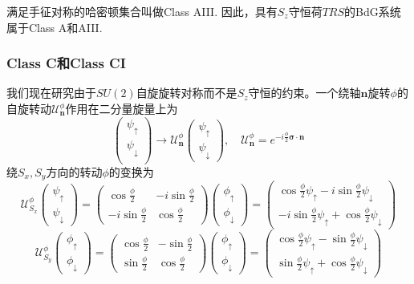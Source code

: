 \documentclass{article}
\numberwithin{equation}{subsection}
\newcommand{\mU}{\mathcal{U}}
\begin{document}
满足手征对称的哈密顿集合叫做Class AIII. 因此，具有$S_z$守恒荷$TRS$的BdG系统属于Class A和AIII.
\subsubsection{Class C和Class CI}
我们现在研究由于$SU(2)$自旋旋转对称而不是$S_z$守恒的约束。一个绕轴$\mathbf{n}$旋转$\phi$的自旋转动$\mU_{\mathbf{n}}^\phi$作用在二分量旋量上为
\begin{equation}
    \begin{pmatrix}
        \psi_\uparrow\\
        \psi_\downarrow\\
    \end{pmatrix}\rightarrow\mU_{\mathbf{n}}^\phi\begin{pmatrix}
        \psi_\uparrow\\
        \psi_\downarrow
    \end{pmatrix},\quad \mU_{\mathbf{n}}^{\phi}=e^{-i\frac{\phi}{2}\mathbf{\sigma}\cdot\mathbf{n}}
\end{equation}
绕$S_x,S_y$方向的转动$\phi$的变换为
\begin{equation}
    \mU_{S_x}^\phi\begin{pmatrix}
        \psi_{\uparrow}\\
        \psi_{\downarrow}
    \end{pmatrix}=\begin{pmatrix}
        \cos\frac{\phi}{2}&-i\sin\frac{\phi}{2}\\
        -i\sin\frac{\phi}{2}&\cos\frac{\phi}{2}
    \end{pmatrix}\begin{pmatrix}
        \phi_\uparrow\\
        \phi_\downarrow
    \end{pmatrix}=\begin{pmatrix}
        \cos\frac{\phi}{2}\psi_\uparrow-i\sin\frac{\phi}{2}\psi_\downarrow\\
        -i\sin\frac{\phi}{2}\psi_\uparrow+\cos\frac{\phi}{2}\psi_\downarrow
    \end{pmatrix}
\end{equation}
\begin{equation}
    \mU_{S_y}^\phi\begin{pmatrix}
        \phi_\uparrow\\
        \phi_\downarrow
    \end{pmatrix}=\begin{pmatrix}
        \cos\frac{\phi}{2}&-\sin\frac{\phi}{2}\\
        \sin\frac{\phi}{2}&\cos\frac{\phi}{2}
    \end{pmatrix}\begin{pmatrix}
        \phi_\uparrow\\
        \phi_\downarrow
    \end{pmatrix}=\begin{pmatrix}
        \cos\frac{\phi}{2}\psi_\uparrow-\sin\frac{\phi}{2}\psi_\downarrow\\
        \sin\frac{\phi}{2}\psi_\uparrow+\cos\frac{\phi}{2}\psi_\downarrow
    \end{pmatrix}
\end{equation}
\end{document}
